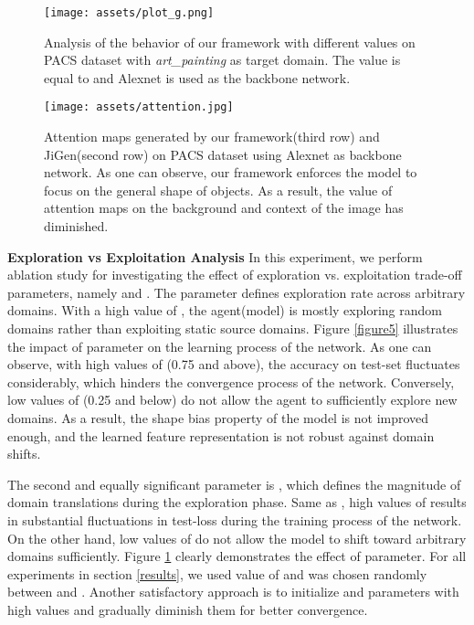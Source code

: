 \documentclass[10pt,twocolumn,letterpaper]{article}
\begin{document}
\begin{figure}[t!]
	\begin{center}
		\texttt{[image: assets/plot\_g.png]}
	\end{center}
	\caption{Analysis of the behavior of our framework with different  values on PACS dataset \cite{li2017deeper} with \textit{art\_painting} as target domain. The  value is equal to  and Alexnet is used as the backbone network.}
	\label{figur6}
\end{figure}

\begin{figure*}[t!]
	\begin{center}
		\texttt{[image: assets/attention.jpg]}
	\end{center}
	\caption{Attention maps generated by our framework(third row) and JiGen\cite{carlucci2019domain}(second row) on PACS dataset\cite{li2017deeper} using Alexnet as backbone network. As one can observe, our framework enforces the model to focus on the general shape of objects. As a result, the value of attention maps on the background and context of the image has diminished.}\label{figure7}
\end{figure*}

\vspace{2mm}
\noindent
\textbf{Exploration vs Exploitation Analysis}\quad
In this experiment, we perform ablation study for investigating the effect of exploration vs. exploitation trade-off parameters, namely  and . The  parameter defines exploration rate across arbitrary domains. With a high value of , the agent(model) is mostly exploring random domains rather than exploiting static source domains. Figure \ref{figure5} illustrates the impact of  parameter on the learning process of the network. 
As one can observe, with high values of  (0.75 and above), the accuracy on test-set fluctuates considerably, which hinders the convergence process of the network. Conversely, low values of  (0.25 and below) do not allow the agent to sufficiently explore new domains. As a result, the shape bias property of the model is not improved enough, and the learned feature representation is not robust against domain shifts.

The second and equally significant parameter is , which defines the magnitude of domain translations during the exploration phase. Same as , high values of  results in substantial fluctuations in test-loss during the training process of the network. On the other hand, low values of  do not allow the model to shift toward arbitrary domains sufficiently. Figure \ref{figur6} clearly demonstrates the effect of  parameter.
For all experiments in section \ref{results}, we used  value of  and  was chosen randomly between  and .
Another satisfactory approach is to initialize  and  parameters with high values and gradually diminish them for better convergence.
\end{document}
